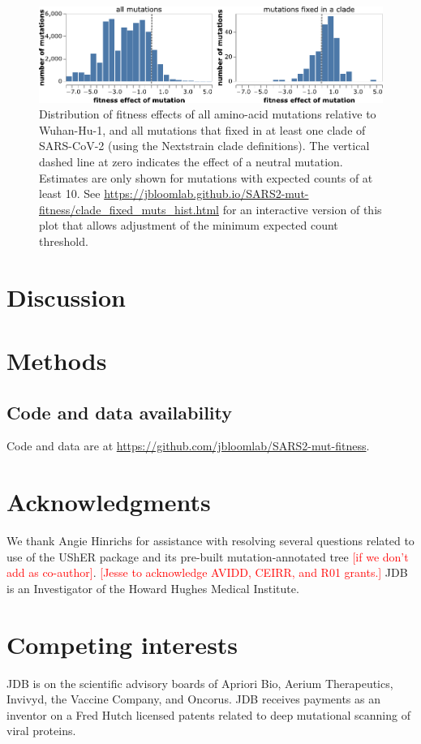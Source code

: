 \documentclass[9pt,twocolumn,twoside]{gsajnl_modified}
\newcommand\jdbcomment[1]{\textcolor{red}{[#1]}}
\begin{document}
\begin{figure}
\centering
\includegraphics[width=0.7\linewidth]{figs/fixed_dist.pdf}
\caption{
Distribution of fitness effects of all amino-acid mutations relative to Wuhan-Hu-1, and all mutations that fixed in at least one clade of SARS-CoV-2 (using the Nextstrain clade definitions).
The vertical dashed line at zero indicates the effect of a neutral mutation.
Estimates are only shown for mutations with expected counts of at least 10.
See \url{https://jbloomlab.github.io/SARS2-mut-fitness/clade_fixed_muts_hist.html} for an interactive version of this plot that allows adjustment of the minimum expected count threshold.
\label{fig:fixed_dist}
}
\end{figure}

\section{Discussion}


{\small

\section{Methods}
\subsection{Code and data availability}
Code and data are at \url{https://github.com/jbloomlab/SARS2-mut-fitness}.

\section{Acknowledgments}
We thank Angie Hinrichs for assistance with resolving several questions related to use of the UShER package and its pre-built mutation-annotated tree \jdbcomment{if we don't add as co-author}.
\jdbcomment{Jesse to acknowledge AVIDD, CEIRR, and R01 grants.}
JDB is an Investigator of the Howard Hughes Medical Institute.

\section{Competing interests}
JDB is on the scientific advisory boards of Apriori Bio, Aerium Therapeutics, Invivyd, the Vaccine Company, and Oncorus.
JDB receives payments as an inventor on a Fred Hutch licensed patents related to deep mutational scanning of viral proteins.


}
\end{document}
